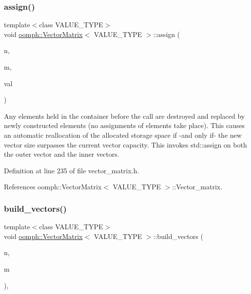 \subsubsection{\texorpdfstring{assign()}{assign()}}
{\footnotesize\ttfamily template$<$class V\+A\+L\+U\+E\+\_\+\+T\+Y\+PE$>$ \\
void \hyperlink{classoomph_1_1VectorMatrix}{oomph\+::\+Vector\+Matrix}$<$ V\+A\+L\+U\+E\+\_\+\+T\+Y\+PE $>$\+::assign (\begin{DoxyParamCaption}\item[{const size\+\_\+t \&}]{n,  }\item[{const size\+\_\+t \&}]{m,  }\item[{const V\+A\+L\+U\+E\+\_\+\+T\+Y\+PE \&}]{val }\end{DoxyParamCaption})\hspace{0.3cm}{\ttfamily [inline]}}



Any elements held in the container before the call are destroyed and replaced by newly constructed elements (no assignments of elements take place). This causes an automatic reallocation of the allocated storage space if -\/and only if-\/ the new vector size surpasses the current vector capacity. This invokes std\+::assign on both the outer vector and the inner vectors. 



Definition at line 235 of file vector\+\_\+matrix.\+h.



References oomph\+::\+Vector\+Matrix$<$ V\+A\+L\+U\+E\+\_\+\+T\+Y\+P\+E $>$\+::\+Vector\+\_\+matrix.

\mbox{\label{classoomph_1_1VectorMatrix_a0ab8c441cec95ba8322fc4ad9b97a288}} 
\subsubsection{\texorpdfstring{build\+\_\+vectors()}{build\_vectors()}}
{\footnotesize\ttfamily template$<$class V\+A\+L\+U\+E\+\_\+\+T\+Y\+PE$>$ \\
void \hyperlink{classoomph_1_1VectorMatrix}{oomph\+::\+Vector\+Matrix}$<$ V\+A\+L\+U\+E\+\_\+\+T\+Y\+PE $>$\+::build\+\_\+vectors (\begin{DoxyParamCaption}\item[{const unsigned \&}]{n,  }\item[{const unsigned \&}]{m }\end{DoxyParamCaption})\hspace{0.3cm}{\ttfamily [inline]}, {\ttfamily [protected]}}



